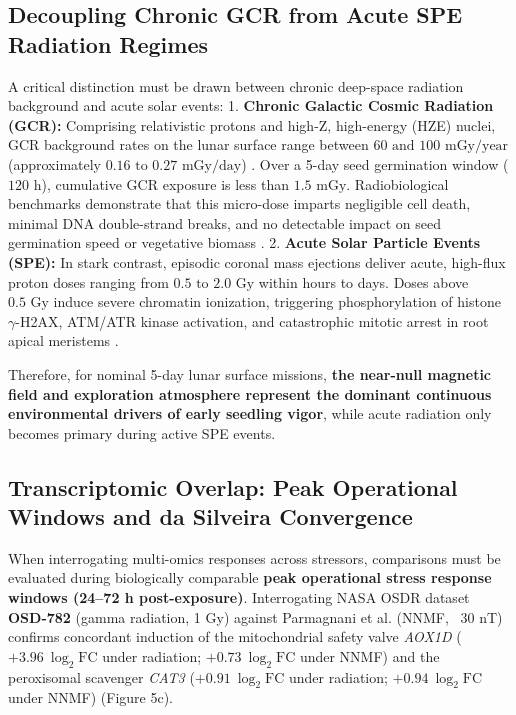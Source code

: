 \documentclass[default,sn-nature,iicol]{sn-jnl}
\begin{document}
\subsection{Decoupling Chronic GCR from Acute SPE Radiation Regimes}
A critical distinction must be drawn between chronic deep-space radiation background and acute solar events:
1. \textbf{Chronic Galactic Cosmic Radiation (GCR):} Comprising relativistic protons and high-Z, high-energy (HZE) nuclei, GCR background rates on the lunar surface range between $60\text{ and }100\text{ mGy/year}$ (approximately $0.16\text{ to }0.27\text{ mGy/day}$) \cite{ref71,ref72}. Over a 5-day seed germination window ($120\text{ h}$), cumulative GCR exposure is less than $1.5\text{ mGy}$. Radiobiological benchmarks demonstrate that this micro-dose imparts negligible cell death, minimal DNA double-strand breaks, and no detectable impact on seed germination speed or vegetative biomass \cite{ref7,ref71}.
2. \textbf{Acute Solar Particle Events (SPE):} In stark contrast, episodic coronal mass ejections deliver acute, high-flux proton doses ranging from $0.5\text{ to }2.0\text{ Gy}$ within hours to days. Doses above $0.5\text{ Gy}$ induce severe chromatin ionization, triggering phosphorylation of histone $\gamma$-H2AX, ATM/ATR kinase activation, and catastrophic mitotic arrest in root apical meristems \cite{ref71,ref72}.

Therefore, for nominal 5-day lunar surface missions, \textbf{the near-null magnetic field and exploration atmosphere represent the dominant continuous environmental drivers of early seedling vigor}, while acute radiation only becomes primary during active SPE events.


\subsection{Transcriptomic Overlap: Peak Operational Windows and da Silveira Convergence}
When interrogating multi-omics responses across stressors, comparisons must be evaluated during biologically comparable \textbf{peak operational stress response windows (24--72 h post-exposure)}. Interrogating NASA OSDR dataset \textbf{OSD-782} (gamma radiation, 1 Gy) against Parmagnani et al. \cite{ref73} (NNMF, ~30 nT) confirms concordant induction of the mitochondrial safety valve \textit{AOX1D} ($+3.96\ \log_2\text{FC}$ under radiation; $+0.73\ \log_2\text{FC}$ under NNMF) and the peroxisomal scavenger \textit{CAT3} ($+0.91\ \log_2\text{FC}$ under radiation; $+0.94\ \log_2\text{FC}$ under NNMF) (Figure 5c).
\end{document}
